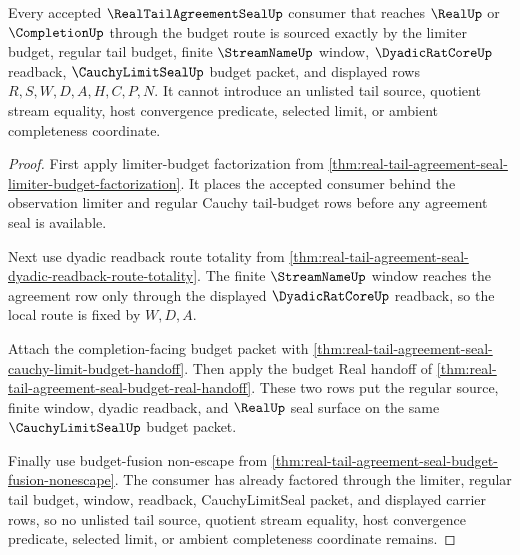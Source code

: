 \begin{theorem}
\label{thm:real-tail-agreement-seal-budget-source-totality}
Every accepted $\RealTailAgreementSealUp$ consumer that reaches $\RealUp$ or $\CompletionUp$ through the budget route is sourced exactly by the limiter budget, regular tail budget, finite $\StreamNameUp$ window, $\DyadicRatCoreUp$ readback, $\CauchyLimitSealUp$ budget packet, and displayed rows $R,S,W,D,A,H,C,P,N$. It cannot introduce an unlisted tail source, quotient stream equality, host convergence predicate, selected limit, or ambient completeness coordinate.
\end{theorem}
\begin{proof}
First apply limiter-budget factorization from \autoref{thm:real-tail-agreement-seal-limiter-budget-factorization}. It places the accepted consumer behind the observation limiter and regular Cauchy tail-budget rows before any agreement seal is available.

Next use dyadic readback route totality from \autoref{thm:real-tail-agreement-seal-dyadic-readback-route-totality}. The finite $\StreamNameUp$ window reaches the agreement row only through the displayed $\DyadicRatCoreUp$ readback, so the local route is fixed by $W,D,A$.

Attach the completion-facing budget packet with \autoref{thm:real-tail-agreement-seal-cauchy-limit-budget-handoff}. Then apply the budget Real handoff of \autoref{thm:real-tail-agreement-seal-budget-real-handoff}. These two rows put the regular source, finite window, dyadic readback, and $\RealUp$ seal surface on the same $\CauchyLimitSealUp$ budget packet.

Finally use budget-fusion non-escape from \autoref{thm:real-tail-agreement-seal-budget-fusion-nonescape}. The consumer has already factored through the limiter, regular tail budget, window, readback, CauchyLimitSeal packet, and displayed carrier rows, so no unlisted tail source, quotient stream equality, host convergence predicate, selected limit, or ambient completeness coordinate remains.
\end{proof}

